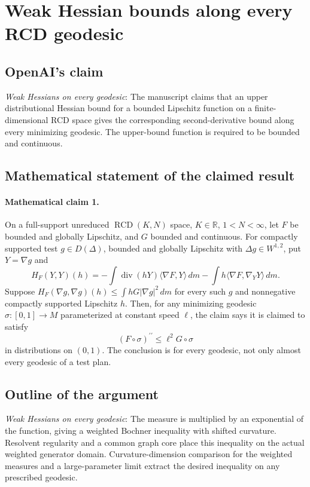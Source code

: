 \documentclass[11pt]{article}
\begin{document}
\section*{Weak Hessian bounds along every RCD geodesic}

\subsection{OpenAI's claim}
\textit{Weak Hessians on every geodesic}: The manuscript claims that an upper distributional Hessian bound for a bounded Lipschitz function on a finite-dimensional RCD space gives the corresponding second-derivative bound along every minimizing geodesic. The upper-bound function is required to be bounded and continuous.

\subsection{Mathematical statement of the claimed result}
\paragraph{Mathematical claim 1.} On a full-support unreduced $\operatorname{RCD}(K,N)$ space, $K\in\mathbb R$, $1<N<\infty$, let $F$ be bounded and globally Lipschitz, and $G$ bounded and continuous. For compactly supported test $g\in D(\Delta)$, bounded and globally Lipschitz with $\Delta g\in W^{1,2}$, put $Y=\nabla g$ and \[H_F(Y,Y)(h)=-\int\operatorname{div}(hY)\langle\nabla F,Y\rangle\,dm-\int h\langle\nabla F,\nabla_YY\rangle\,dm.\] Suppose $H_F(\nabla g,\nabla g)(h)\le\int hG|\nabla g|^2\,dm$ for every such $g$ and nonnegative compactly supported Lipschitz $h$. Then, for any minimizing geodesic $\sigma:[0,1]\to M$ parameterized at constant speed $\ell$, the claim says it is claimed to satisfy \[(F\circ\sigma)^{\prime\prime}\le\ell^2G\circ\sigma\] in distributions on $(0,1)$. The conclusion is for every geodesic, not only almost every geodesic of a test plan.

\subsection{Outline of the argument}
\textit{Weak Hessians on every geodesic}: The measure is multiplied by an exponential of the function, giving a weighted Bochner inequality with shifted curvature. Resolvent regularity and a common graph core place this inequality on the actual weighted generator domain. Curvature-dimension comparison for the weighted measures and a large-parameter limit extract the desired inequality on any prescribed geodesic.
\end{document}
